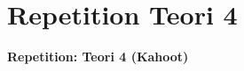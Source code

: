 \section{Repetition Teori 4}

\begin{frame}
  \vspace{3em}
  \begin{center}
    {\LARGE \textbf{Repetition: Teori 4 (Kahoot)}}
  \end{center}
\end{frame}
